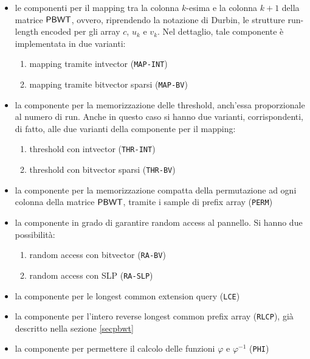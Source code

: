 \begin{itemize}
  \item le componenti per il mapping tra la colonna $k$-esima e la colonna
  $k+1$ della matrice $\mbox{\rm {\sf PBWT}}$, ovvero, riprendendo la notazione di Durbin, le
  strutture run-length 
  encoded per gli array $c$, $u_k$ e $v_k$. Nel dettaglio, tale componente è
  implementata in due varianti:
  \begin{enumerate}
    \item mapping tramite intvector (\texttt{MAP-INT})
    \item mapping tramite bitvector sparsi (\texttt{MAP-BV})
  \end{enumerate}
  \item la componente per la memorizzazione delle threshold, anch'essa
  proporzionale al numero di run. Anche in questo caso si hanno due varianti,
  corrispondenti, di fatto, alle due varianti della componente per il mapping:
  \begin{enumerate}
    \item threshold con intvector (\texttt{THR-INT})
    \item threshold con bitvector sparsi (\texttt{THR-BV})
  \end{enumerate}
  \item la componente per la memorizzazione compatta della permutazione ad ogni
  colonna 
  della matrice $\mbox{\rm {\sf PBWT}}$, tramite i sample di prefix array
  (\texttt{PERM}) 
  \item la componente in grado di garantire random access al
  pannello. Si hanno due possibilità:
  \begin{enumerate}
    \item random access con bitvector (\texttt{RA-BV})
    \item random access con SLP (\texttt{RA-SLP})
  \end{enumerate}
  \item la componente per le longest common extension query
  (\texttt{LCE}) 
  \item la componente per l'intero reverse longest common prefix array
  (\texttt{RLCP}), già descritto nella sezione \ref{secpbwt}
  \item la componente per permettere il calcolo delle funzioni
  $\varphi$ e $\varphi^{-1}$ (\texttt{PHI})
\end{itemize}


